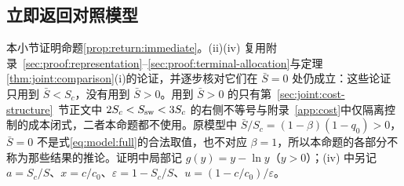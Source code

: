 \subsection{立即返回对照模型}
\label{sec:proof:return:immediate}
本小节证明命题\ref{prop:return:immediate}。(ii)(iv) 复用附录~\ref{sec:proof:representation}--\ref{sec:proof:terminal-allocation}与定理\ref{thm:joint:comparison}(i)的论证，并逐步核对它们在 $\bar S=0$ 处仍成立：这些论证只用到 $\bar S<S_c$，没有用到 $\bar S>0$。用到 $\bar S>0$ 的只有第~\ref{sec:joint:cost-structure}~节正文中 $2S_c<S_{\rm sw}<3S_c$ 的右侧不等号与附录~\ref{app:cost}中仅隔离控制的成本闭式，二者本命题都不使用。原模型中 $\bar S/S_c=(1-\beta)(1-q_0)>0$，$\bar S=0$ 不是式\eqref{eq:model:full}的合法取值，也不对应 $\beta=1$，所以本命题的各部分不称为那些结果的推论。证明中局部记 $g(y)=y-\ln y$（$y>0$）；(iv) 中另记 $a=S_c/S$、$x=c/c_0$、$\varepsilon=1-S_c/S$、$u=(1-c/c_0)/\varepsilon$。

